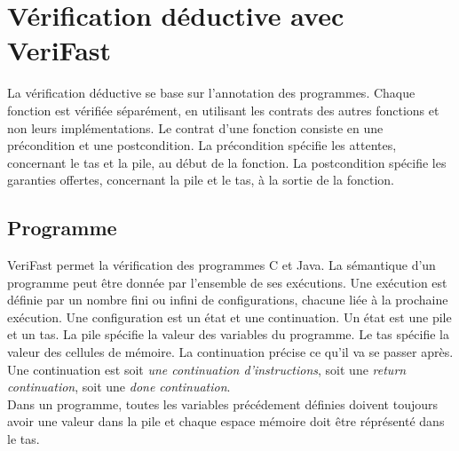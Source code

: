 \documentclass[11pt,openany]{article}
\newcommand{\verifast}{VeriFast}
\begin{document}
\section{V\'erification d\'eductive avec \verifast{}}
	La v\'erification d\'eductive se base sur l'annotation des programmes. Chaque fonction est v\'erifi\'ee s\'epar\'ement, en utilisant les contrats des autres fonctions et non leurs impl\'ementations. Le contrat d'une fonction consiste en une pr\'econdition et une postcondition. La pr\'econdition sp\'ecifie les attentes, concernant le tas et la pile, au d\'ebut de la fonction. La postcondition sp\'ecifie les garanties offertes, concernant la pile et le tas, \`a la sortie de la fonction.
	\subsection{Programme}
		\verifast{} permet la v\'erification des programmes C et Java. La s\'emantique d'un programme peut \^etre donn\'ee par l'ensemble de ses ex\'ecutions. Une ex\'ecution est d\'efinie par un nombre fini ou infini de configurations, chacune li\'ee \`a la prochaine ex\'ecution. Une configuration est un \'etat et une continuation. Un \'etat est une pile et un tas. La pile sp\'ecifie la valeur des variables du programme. Le tas sp\'ecifie la valeur des cellules de m\'emoire. La continuation pr\'ecise ce qu'il va se passer apr\`es. Une continuation est soit \textit{une continuation d'instructions}, soit une \textit{return continuation}, soit une \textit{done continuation}.\\
	Dans un programme, toutes les variables pr\'ec\'edement d\'efinies doivent toujours avoir une valeur dans la pile et chaque espace m\'emoire doit \^etre r\'epr\'esent\'e dans le tas.
\end{document}
